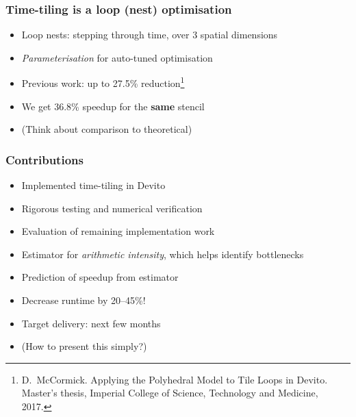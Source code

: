 \documentclass{beamer}
\begin{document}
%



\begin{frame}
\frametitle{Time-tiling is a loop (nest) optimisation}

\begin{itemize}
	\item Loop nests: stepping through time, over 3 spatial dimensions
	\item \emph{Parameterisation} for auto-tuned optimisation
	\item Previous work: up to 27.5\% reduction\footnote{D.~McCormick. Applying the Polyhedral Model to Tile Loops in Devito. Master's thesis, Imperial College of Science, Technology and Medicine, 2017.}
	\item We get 36.8\% speedup for the \textbf{same} stencil
	\item (Think about comparison to theoretical)
\end{itemize}
\end{frame}



\begin{frame}
\frametitle{Contributions}

\begin{itemize}
	\item Implemented time-tiling in Devito
	\item Rigorous testing and numerical verification
	\item Evaluation of remaining implementation work
	\item Estimator for \emph{arithmetic intensity}, which helps identify bottlenecks
	\item Prediction of speedup from estimator
	\item Decrease runtime by 20--45\%!
	\newline
	\item Target delivery: next few months
	\item (How to present this simply?)
\end{itemize}
\end{frame}
\end{document}
